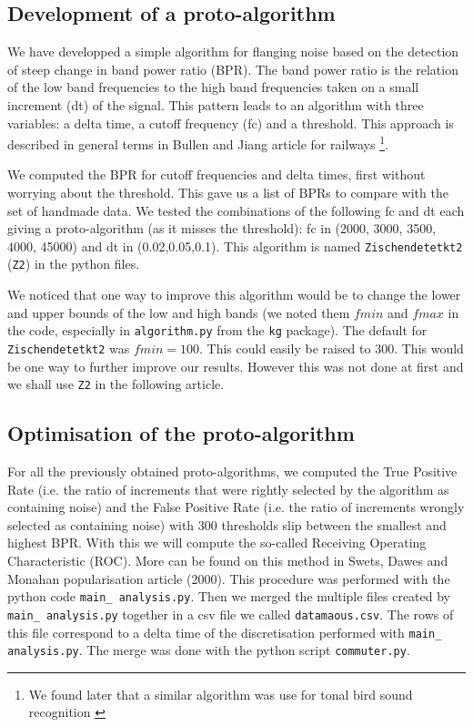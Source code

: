 \documentclass{article}\usepackage[]{graphicx}\usepackage[]{color}
\begin{document}
\subsection{Development of a proto-algorithm} We have developped a simple algorithm for flanging noise based on the detection of steep change in band power ratio (BPR). The band power ratio is the relation of the low band frequencies to the high band frequencies taken on a small increment (dt) of the signal. This pattern leads to an algorithm with three variables: a delta time, a cutoff frequency (fc) and a threshold. This approach is described in general terms in Bullen and Jiang article for railways \citeyear{Bullen2010}\footnote{We found later that a similar algorithm was use for tonal bird sound recognition \autocite{Jancovic2011}}.

We computed the BPR for cutoff frequencies and delta times, first without worrying about the threshold. This gave us a list of BPRs to compare with the set of handmade data. We tested the combinations of the following fc and dt each giving a proto-algorithm (as it misses the threshold): fc in (2000, 3000, 3500, 4000, 45000) and dt in (0.02,0.05,0.1). This algorithm is named {\tt Zischendetetkt2} ({\tt Z2}) in the python files.

We noticed that one way to improve this algorithm would be to change the lower and upper bounds of the low and high bands (we noted them $fmin$ and $fmax$ in the code, especially in {\tt algorithm.py} from the {\tt kg} package). The default for {\tt Zischendetetkt2} was $fmin=100$. This could easily be raised to $300$. This would be one way to further improve our results. However this was not done at first and we shall use {\tt Z2} in the following article.

\subsection{Optimisation of the proto-algorithm} For all the previously obtained proto-algorithms, we computed the True Positive Rate (i.e. the ratio of increments that were rightly selected by the algorithm as containing noise) and the False Positive Rate (i.e. the ratio of increments wrongly selected as containing noise) with 300 thresholds slip between the smallest and highest BPR. With this we will compute the so-called Receiving Operating Characteristic (ROC). More can be found on this method in Swets, Dawes and Monahan popularisation article (2000). This procedure was performed with the python code {\tt main\_ analysis.py}. Then we merged the multiple files created by {\tt main\_ analysis.py} together in a csv file we called {\tt datamaous.csv}. The rows of this file correspond to a delta time of the discretisation performed with {\tt main\_ analysis.py}. The merge was done with the python script {\tt commuter.py}.
\end{document}
